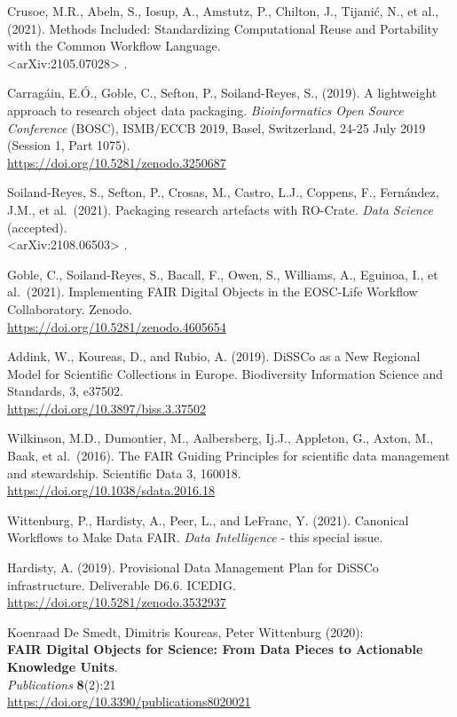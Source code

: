 \begin{thebibliography}{9}
 Crusoe, M.R., Abeln, S., Iosup, A., Amstutz, P., Chilton, J.,
Tijanić, N., et al., (2021). Methods Included: Standardizing
Computational Reuse and Portability with the Common Workflow Language.\\
\textless arXiv:2105.07028\textgreater{} .

 Carragáin, E.Ó., Goble, C., Sefton, P., Soiland-Reyes, S.,
(2019). A lightweight approach to research object data packaging.
\emph{Bioinformatics Open Source Conference} (BOSC), ISMB/ECCB 2019,
Basel, Switzerland, 24-25 July 2019 (Session 1, Part 1075).\\
\url{https://doi.org/10.5281/zenodo.3250687}

 Soiland-Reyes, S., Sefton, P., Crosas, M., Castro, L.J.,
Coppens, F., Fernández, J.M., et al.~(2021). Packaging research
artefacts with RO-Crate. \emph{Data Science} (accepted).\\
\textless arXiv:2108.06503\textgreater{} .

 Goble, C., Soiland-Reyes, S., Bacall, F., Owen, S., Williams,
A., Eguinoa, I., et al.~(2021). Implementing FAIR Digital Objects in the
EOSC-Life Workflow Collaboratory. Zenodo.\\
\url{https://doi.org/10.5281/zenodo.4605654}

 Addink, W., Koureas, D., and Rubio, A. (2019). DiSSCo as a New
Regional Model for Scientific Collections in Europe. Biodiversity
Information Science and Standards, 3, e37502.\\
\url{https://doi.org/10.3897/biss.3.37502}

 Wilkinson, M.D., Dumontier, M., Aalbersberg, Ij.J., Appleton,
G., Axton, M., Baak, et al.~(2016). The FAIR Guiding Principles for
scientific data management and stewardship. Scientific Data 3, 160018.\\
\url{https://doi.org/10.1038/sdata.2016.18}

 Wittenburg, P., Hardisty, A., Peer, L., and LeFranc, Y. (2021).
Canonical Workflows to Make Data FAIR. \emph{Data Intelligence} - this
special issue.

 Hardisty, A. (2019). Provisional Data Management Plan for
DiSSCo infrastructure. Deliverable D6.6. ICEDIG.\\
\url{https://doi.org/10.5281/zenodo.3532937}

 Koenraad De Smedt, Dimitris Koureas, Peter Wittenburg (2020):\\
\textbf{FAIR Digital Objects for Science: From Data Pieces to Actionable
Knowledge Units}.\\
\emph{Publications} \textbf{8}(2):21\\
\url{https://doi.org/10.3390/publications8020021}


\end{thebibliography}
